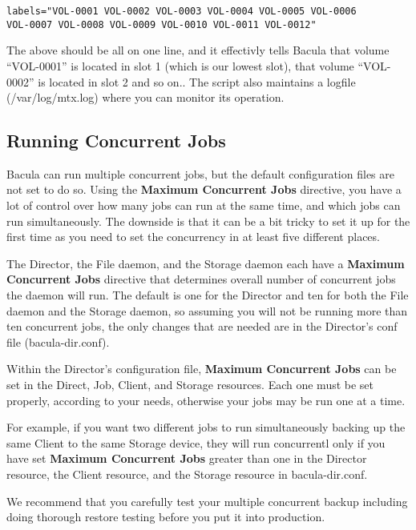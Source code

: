 {\footnotesize
\begin{verbatim}
labels="VOL-0001 VOL-0002 VOL-0003 VOL-0004 VOL-0005 VOL-0006
VOL-0007 VOL-0008 VOL-0009 VOL-0010 VOL-0011 VOL-0012"
\end{verbatim}
\normalsize

The above should be all on one line, and it effectivly tells Bacula that
volume ``VOL-0001'' is located in slot 1 (which is our lowest slot), that
volume ``VOL-0002'' is located in slot 2 and so on..
The script also maintains a logfile (/var/log/mtx.log) where you can monitor
its operation.

\subsection*{Running Concurrent Jobs}
\label{ConcurrentJobs}

Bacula can run multiple concurrent jobs, but the default configuration files
are not set to do so. Using the {\bf Maximum Concurrent Jobs} directive, you
have a lot of control over how many jobs can run at the same time, and which
jobs can run simultaneously. The downside is that it can be a bit tricky to
set it up for the first time as you need to set the concurrency in at least
five different places. 

The Director, the File daemon, and the Storage daemon each have a {\bf Maximum
Concurrent Jobs} directive that determines overall number of concurrent jobs
the daemon will run. The default is one for the Director and ten for both the
File daemon and the Storage daemon, so assuming you will not be running more
than ten concurrent jobs, the only changes that are needed are in the
Director's conf file (bacula-dir.conf). 

Within the Director's configuration file, {\bf Maximum Concurrent Jobs} can be
set in the Direct, Job, Client, and Storage resources. Each one must be set
properly, according to your needs, otherwise your jobs may be run one at a
time. 

For example, if you want two different jobs to run simultaneously backing up
the same Client to the same Storage device, they will run concurrentl only if
you have set {\bf Maximum Concurrent Jobs} greater than one in the Director
resource, the Client resource, and the Storage resource in bacula-dir.conf. 

We recommend that you carefully test your multiple concurrent backup including
doing thorough restore testing before you put it into production. 

}
